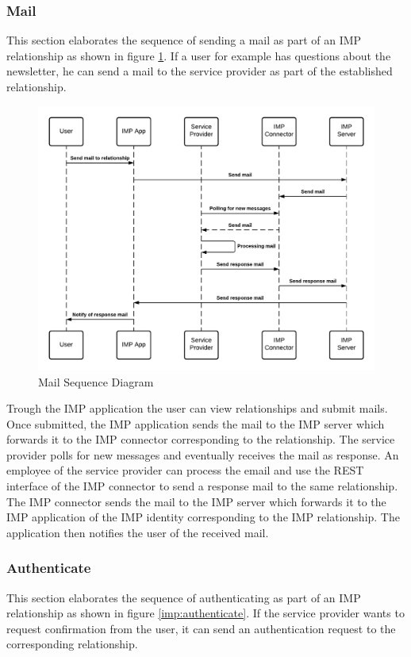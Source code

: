 \subsubsection{Mail}
This section elaborates the sequence of sending a mail as part of an IMP relationship as shown in figure \ref{imp:mail}.
If a user for example has questions about the newsletter, he can send a mail to the service provider as part of the established relationship.

\begin{figure}[H]
    \centering
    \includegraphics[scale=0.6]{Diagrams/IMP Use Case Mail Sequence Diagram.pdf}
    \caption{Mail Sequence Diagram}
    \label{imp:mail}
\end{figure}

Trough the IMP application the user can view relationships and submit mails. Once submitted, the IMP application sends the mail to the IMP server which forwards it to the IMP connector corresponding to the relationship. The service provider polls for new messages and eventually receives the mail as response. An employee of the service provider can process the email and use the REST interface of the IMP connector to send a response mail to the same relationship. The IMP connector sends the mail to the IMP server which forwards it to the IMP application of the IMP identity corresponding to the IMP relationship. The application then notifies the user of the received mail.

\subsubsection{Authenticate}
This section elaborates the sequence of authenticating as part of an IMP relationship as shown in figure \ref{imp:authenticate}.
If the service provider wants to request confirmation from the user, it can send an authentication request to the corresponding relationship.

